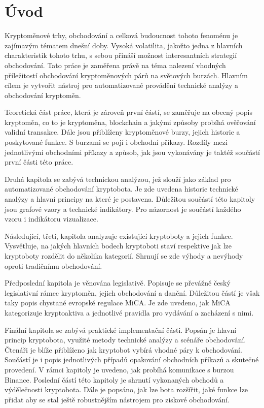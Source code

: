 \chapter{Úvod}
\label{sec:Introduction}
Kryptoměnové trhy, obchodování a celková budoucnost tohoto fenoménu je zajímavým tématem dnešní doby. Vysoká volatilita, jakožto jedna z hlavních charakteristik tohoto trhu, s sebou přináší
možnost interesantních strategií obchodování. Tato práce je zaměřena právě na téma nalezení vhodných příležitostí obchodování kryptoměnových párů na světových burzách. Hlavním cílem
je vytvořit nástroj pro automatizované provádění technické analýzy a obchodování kryptoměn.

Teoretická část práce, která je zároveň první částí, se zaměřuje na obecný popis kryptoměn, co to je kryptoměna, blockchain a jakými způsoby probíhá ověřování validní transakce. Dále jsou
přiblíženy kryptoměnové burzy, jejich historie a poskytované funkce. S burzami se pojí i obchodní příkazy. Rozdíly mezi jednotlivými obchodními příkazy a způsob, jak jsou vykonávány je
taktéž součástí první části této práce.

Druhá kapitola se zabývá technickou analýzou, jež slouží jako základ pro automatizované obchodování kryptobota. Je zde uvedena historie technické analýzy a hlavní principy
na které je postavena. Důležitou součástí této kapitoly jsou grafové vzory a technické indikátory. Pro názornost je součástí každého vzoru i indikátoru vizualizace.

Následující, třetí, kapitola analyzuje existující kryptoboty a jejich funkce. Vysvětluje, na jakých hlavních bodech kryptoboti staví respektive jak lze kryptoboty rozdělit do několika
kategorií. Shrnují se zde výhody a nevýhody oproti tradičnímu obchodování.

Předposlední kapitola je věnována legislativě. Popisuje se převážně český legislativní rámec kryptoměn, jejich obchodování a danění. Důležitou částí je však taky popis chystané evropské
regulace MiCA. Je zde uvedeno, jak MiCA kategorizuje kryptoaktiva a jednotlivé pravidla pro vydávání a zacházení s nimi.

Finální kapitola se zabývá praktické implementační části. Popsán je hlavní princip kryptobota, využité metody technické analýzy a scénáře obchodování. Čtenáři je blíže přiblíženo jak
kryptobot vybírá vhodné páry k obchodování. Součástí je i popis jednotlivých případů opakování obchodních příkazů a skutečné provedení. V rámci kapitoly je uvedeno, jak probíhá komunikace
s burzou Binance. Poslední částí této kapitoly je shrnutí vykonaných obchodů a výdělečnosti kryptobota. Dále je popsáno, jak lze bota rozšířit, jaké funkce lze přidat aby se stal ještě
robustnějším nástrojem pro ziskové obchodování.
\endinput